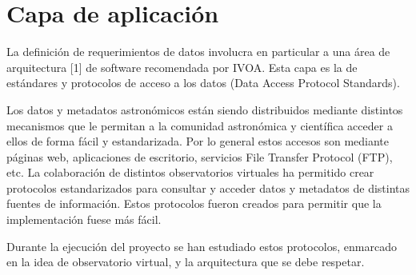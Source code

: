 \section{Capa de aplicación}


La definición de requerimientos de datos involucra en particular a una área de
arquitectura [1] de software recomendada por IVOA. Esta capa es la de
estándares y protocolos de acceso a los datos (Data Access Protocol Standards).

Los datos y metadatos astronómicos están siendo distribuidos mediante distintos
mecanismos que le permitan a la comunidad astronómica y científica acceder a
ellos de forma fácil y estandarizada. Por lo general estos accesos son mediante
páginas web, aplicaciones de escritorio, servicios File Transfer Protocol
(FTP), etc. La colaboración de distintos observatorios virtuales ha permitido
crear protocolos estandarizados para consultar y acceder datos y metadatos de
distintas fuentes de información. Estos protocolos fueron creados para permitir
que la implementación fuese más fácil.

Durante la ejecución del proyecto se han estudiado estos protocolos, enmarcado
en la idea de observatorio virtual, y la arquitectura que se debe respetar.

